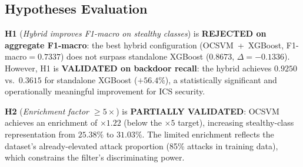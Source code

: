 \subsection{Hypotheses Evaluation}
\label{sec:results_hypotheses}

\textbf{H1} (\textit{Hybrid improves F1-macro on stealthy classes}) is
\textbf{REJECTED on aggregate F1-macro}: the best hybrid configuration
(OCSVM~+~XGBoost, F1-macro$=0.7337$) does not surpass standalone XGBoost
($0.8673$, $\Delta=-0.1336$).
However, H1 is \textbf{VALIDATED on backdoor recall}: the hybrid achieves
$0.9250$ vs.\ $0.3615$ for standalone XGBoost ($+56.4\%$), a statistically
significant and operationally meaningful improvement for ICS security.

\textbf{H2} (\textit{Enrichment factor $\geq 5\times$}) is
\textbf{PARTIALLY VALIDATED}: OCSVM achieves an enrichment of $\times 1.22$
(below the $\times 5$ target), increasing stealthy-class representation
from $25.38\%$ to $31.03\%$. The limited enrichment reflects the dataset's
already-elevated attack proportion (85\% attacks in training data),
which constrains the filter's discriminating power.
